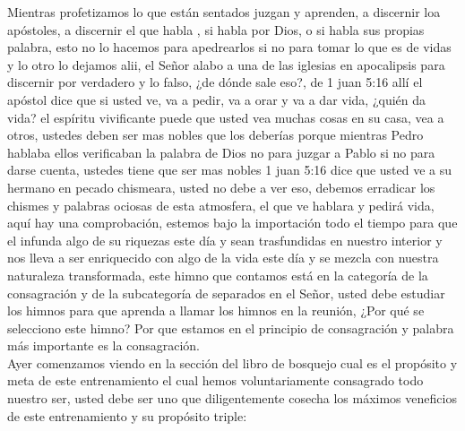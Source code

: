 \documentclass[12pt]{article}
\begin{document}
Mientras profetizamos lo que están sentados juzgan y aprenden, a discernir loa apóstoles, a discernir el que habla , si habla por Dios, o si habla sus propias palabra, esto no lo hacemos para apedrearlos si no para tomar lo que es de vidas y lo otro lo dejamos alii, el Señor alabo a una de las iglesias en apocalipsis para discernir por verdadero y lo falso, ¿de dónde sale eso?, de 1 juan 5:16 allí el apóstol dice que si usted ve, va a pedir, va a orar y va a dar vida, ¿quién da vida? el espíritu vivificante puede que usted vea muchas cosas en su casa, vea a otros, ustedes deben ser mas nobles que los deberías porque mientras Pedro hablaba ellos verificaban la palabra de Dios no para juzgar a Pablo si no para darse cuenta, ustedes tiene que ser mas nobles 1 juan 5:16 dice que usted ve a su hermano en pecado chismeara, usted no debe a ver eso, debemos erradicar los chismes y palabras ociosas de esta atmosfera, el que ve hablara y pedirá vida, aquí hay una comprobación, estemos bajo la importación todo el tiempo para que el infunda algo de su riquezas este día y sean trasfundidas en nuestro interior y nos lleva a ser enriquecido con algo de la vida este día y se mezcla con nuestra naturaleza transformada, este himno que contamos está en la categoría de la consagración y  de la subcategoría de separados en el Señor, usted debe estudiar los himnos para que aprenda a llamar los himnos en la reunión, ¿Por qué se selecciono este himno? Por que estamos en el principio de consagración y palabra más importante es la consagración.\\

Ayer comenzamos viendo en la sección del libro de bosquejo cual es el propósito y meta de este entrenamiento el cual hemos voluntariamente consagrado todo nuestro ser, usted debe ser uno que diligentemente cosecha los máximos veneficios de este entrenamiento y su propósito triple:\\
\end{document}
